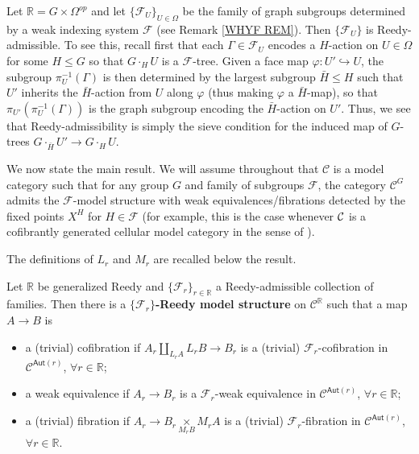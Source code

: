 \documentclass[a4paper,10pt
 ,draft
]{article}%
\begin{document}
\begin{example}\label{FGRAPHREEDY EX}
	Let $\mathbb{R} = G \times \Omega^{op}$ and let
	$\{\mathcal{F}_U\}_{U \in \Omega}$ be the family of graph subgroups determined by a weak indexing system $\mathcal{F}$ (see Remark \ref{WHYF REM}).
	Then $\{\mathcal{F}_U\}$ is Reedy-admissible.
	To see this, recall first that each $\Gamma \in \mathcal{F}_U$ encodes 
	a $H$-action on $U \in \Omega$ for some $H \leq G$
	so that $G \cdot_H U$ is a $\mathcal{F}$-tree.
	Given a face map $\varphi \colon U' \hookrightarrow U$, 
	the subgroup $\pi^{-1}_U(\Gamma)$ is then determined by the largest subgroup $\bar{H}\leq H$ such that 
	$U'$ inherits the $\bar{H}$-action from $U$ along $\varphi$ (thus making $\varphi$ a $\bar{H}$-map), 
	so that $\pi_{U'}\left(\pi^{-1}_U(\Gamma)\right)$ is the graph subgroup encoding the $\bar{H}$-action on $U'$.
	Thus, we see that Reedy-admissibility is simply the sieve condition for the induced map of $G$-trees
	$G \cdot_{\bar{H}} U' \to G \cdot_H U$.
\end{example}


We now state the main result.
We will assume throughout that $\mathcal{C}$ is a model category such that for any group $G$ and family of subgroups $\mathcal{F}$,
the category $\mathcal{C}^G$ admits the
$\mathcal{F}$-model structure
with weak equivalences/fibrations detected by the fixed points
$X^H$ for $H \in \mathcal{F}$
(for example, this is the case whenever $\mathcal{C}$ is a cofibrantly generated cellular model category in the sense of \cite{Ste16}).

The definitions of $L_r$ and $M_r$ are recalled below the result.

\begin{theorem}\label{REEDYADM THM}
Let $\mathbb{R}$ be generalized Reedy and 
$\{\mathcal{F}_r\}_{r \in \mathbb{R}}$ a Reedy-admissible collection of families. 
Then there is a \textbf{$\{\mathcal{F}_r\}$-Reedy model structure} on
$\mathcal{C}^{\mathbb{R}}$ such that a map $A \to B$ is
\begin{itemize}
  \item a (trivial) cofibration if $A_r \underset{L_r A}{\amalg}L_r B \to B_r$ is a (trivial) $\mathcal{F}_r$-cofibration in $\mathcal{C}^{\mathsf{Aut}(r)}$, $\forall r \in \mathbb{R}$;
	\item a weak equivalence if $A_r \to B_r$ is a $\mathcal{F}_r$-weak equivalence in $\mathcal{C}^{\mathsf{Aut}(r)}$, $\forall r \in \mathbb{R}$;
	\item a (trivial) fibration if $A_r \to B_r \underset{M_r B}{\times }M_r A $ is a (trivial) $\mathcal{F}_r$-fibration in $\mathcal{C}^{\mathsf{Aut}(r)}$, $\forall r \in \mathbb{R}$.
\end{itemize}
\end{theorem}
\end{document}
